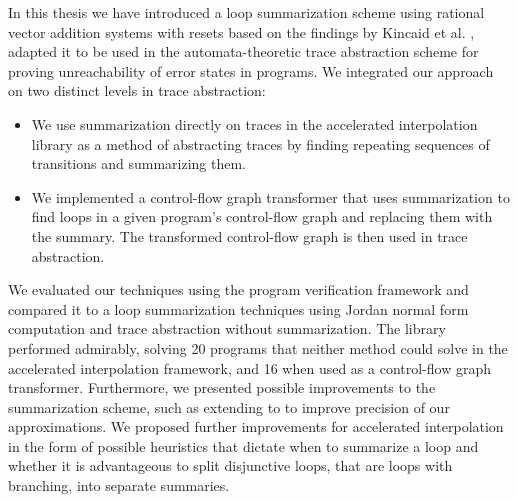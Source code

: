 In this thesis we have introduced a loop summarization scheme using rational vector addition systems with resets based on the findings by Kincaid et al. \cite{DBLP:conf/cav/SilvermanK19}, adapted it to be used in the automata-theoretic trace abstraction scheme \cite{10.1007/978-3-642-03237-0_7, 10.1007/978-3-642-39799-8_2, 10.1145/1706299.1706353} for proving unreachability of error states in programs. We integrated our \qvasr approach on two distinct levels in trace abstraction:
\begin{itemize}
	\item We use \qvasr summarization directly on traces in the accelerated interpolation library as a method of abstracting traces by finding repeating sequences of transitions and summarizing them.
	\item We implemented a control-flow graph transformer that uses \qvasr summarization to find loops in a given program's control-flow graph and replacing them with the summary. The transformed control-flow graph is then used in trace abstraction.
\end{itemize} 

We evaluated our techniques using the program verification framework \ultimate \cite{Zitat02} and compared it to a loop summarization techniques using Jordan normal form computation and trace abstraction without summarization. The \qvasr library performed admirably, solving 20 programs that neither method could solve in the accelerated interpolation framework, and 16 when used as a control-flow graph transformer.
Furthermore, we presented possible improvements to the \qvasr summarization scheme, such as extending \qvasr to \qvasrs to improve precision of our approximations. We proposed further improvements for accelerated interpolation in the form of possible heuristics that dictate when to summarize a loop and whether it is advantageous to split disjunctive loops, that are loops with branching, into separate summaries.
